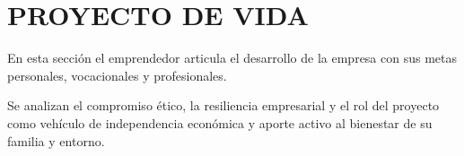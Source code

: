 \chapter{PROYECTO DE VIDA}
\label{chap:proyecto_vida}

En esta sección el emprendedor articula el desarrollo de la empresa con sus metas personales, vocacionales y profesionales.

Se analizan el compromiso ético, la resiliencia empresarial y el rol del proyecto como vehículo de independencia económica y aporte activo al bienestar de su familia y entorno.
